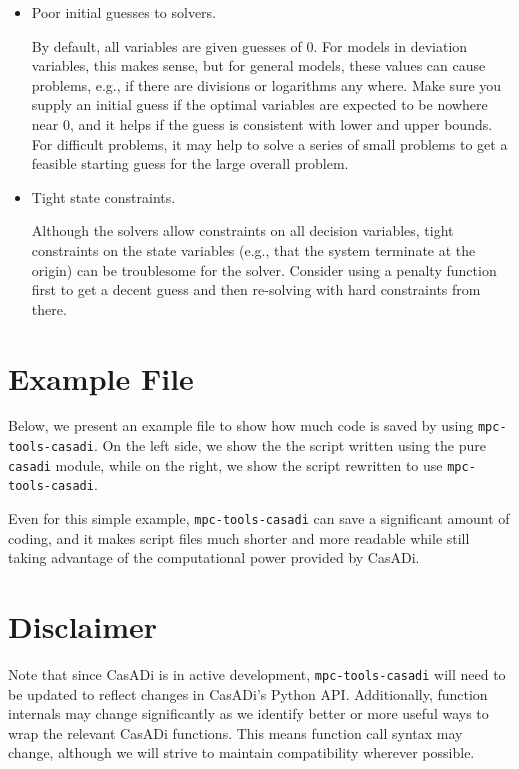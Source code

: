 \documentclass{article}
\newcommand{\casadi}{CasADi}
\begin{document}
\begin{itemize}
    \item Poor initial guesses to solvers.
    
    By default, all variables are given guesses of 0.
    For models in deviation variables, this makes sense, but for general models, these values can cause problems, e.g., if there are divisions or logarithms any where.
    Make sure you supply an initial guess if the optimal variables are expected to be nowhere near 0, and it helps if the guess is consistent with lower and upper bounds.
    For difficult problems, it may help to solve a series of small problems to get a feasible starting guess for the large overall problem.
    
    \item Tight state constraints.
    
    Although the solvers allow constraints on all decision variables, tight constraints on the state variables (e.g., that the system terminate at the origin) can be troublesome for the solver.
    Consider using a penalty function first to get a decent guess and then re-solving with hard constraints from there.
    
\end{itemize}

\section{Example File}

Below, we present an example file to show how much code is saved by using \texttt{mpc-tools-casadi}.
On the left side, we show the the script written using the pure \texttt{casadi} module, while on the right, we show the script rewritten to use \texttt{mpc-tools-casadi}.

\hspace{1em}



Even for this simple example, \texttt{mpc-tools-casadi} can save a significant amount of coding, and it makes script files much shorter and more readable while still taking advantage of the computational power provided by \casadi{}.

\section{Disclaimer}

Note that since \casadi{} is in active development, \texttt{mpc-tools-casadi} will need to be updated to reflect changes in \casadi{}'s Python API.
Additionally, function internals may change significantly as we identify better or more useful ways to wrap the relevant \casadi{} functions.
This means function call syntax may change, although we will strive to maintain compatibility wherever possible.
\end{document}
